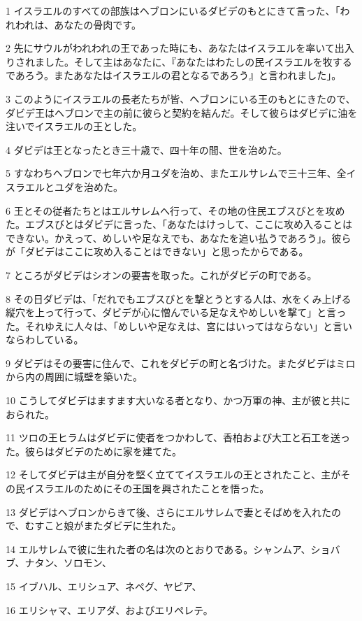 \par 1 イスラエルのすべての部族はヘブロンにいるダビデのもとにきて言った、「われわれは、あなたの骨肉です。
\par 2 先にサウルがわれわれの王であった時にも、あなたはイスラエルを率いて出入りされました。そして主はあなたに、『あなたはわたしの民イスラエルを牧するであろう。またあなたはイスラエルの君となるであろう』と言われました」。
\par 3 このようにイスラエルの長老たちが皆、ヘブロンにいる王のもとにきたので、ダビデ王はヘブロンで主の前に彼らと契約を結んだ。そして彼らはダビデに油を注いでイスラエルの王とした。
\par 4 ダビデは王となったとき三十歳で、四十年の間、世を治めた。
\par 5 すなわちヘブロンで七年六か月ユダを治め、またエルサレムで三十三年、全イスラエルとユダを治めた。
\par 6 王とその従者たちとはエルサレムへ行って、その地の住民エブスびとを攻めた。エブスびとはダビデに言った、「あなたはけっして、ここに攻め入ることはできない。かえって、めしいや足なえでも、あなたを追い払うであろう」。彼らが「ダビデはここに攻め入ることはできない」と思ったからである。
\par 7 ところがダビデはシオンの要害を取った。これがダビデの町である。
\par 8 その日ダビデは、「だれでもエブスびとを撃とうとする人は、水をくみ上げる縦穴を上って行って、ダビデが心に憎んでいる足なえやめしいを撃て」と言った。それゆえに人々は、「めしいや足なえは、宮にはいってはならない」と言いならわしている。
\par 9 ダビデはその要害に住んで、これをダビデの町と名づけた。またダビデはミロから内の周囲に城壁を築いた。
\par 10 こうしてダビデはますます大いなる者となり、かつ万軍の神、主が彼と共におられた。
\par 11 ツロの王ヒラムはダビデに使者をつかわして、香柏および大工と石工を送った。彼らはダビデのために家を建てた。
\par 12 そしてダビデは主が自分を堅く立ててイスラエルの王とされたこと、主がその民イスラエルのためにその王国を興されたことを悟った。
\par 13 ダビデはヘブロンからきて後、さらにエルサレムで妻とそばめを入れたので、むすこと娘がまたダビデに生れた。
\par 14 エルサレムで彼に生れた者の名は次のとおりである。シャンムア、ショバブ、ナタン、ソロモン、
\par 15 イブハル、エリシュア、ネペグ、ヤピア、
\par 16 エリシャマ、エリアダ、およびエリペレテ。
